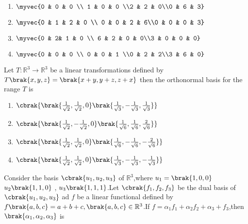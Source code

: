   \begin{multicols}{4}
      \begin{enumerate}
          \item $\myvec{0 & 0 & 0 \\ 1 & 0 & 0 \\2 & 2 & 0\\0 & 6 & 3}$
          \item $\myvec{0 & 1 & 2 & 0 \\ 0 & 0 & 2 & 6\\0 & 0 & 0 & 3}$
         \item $\myvec{0 & 2& 1 & 0 \\ 6 & 2 & 0 & 0\\3 & 0 & 0 & 0}$
          \item $\myvec{0 & 0 & 0 \\ 0 & 0 & 1 \\0 & 2 & 2\\3 & 6 & 0}$
      \end{enumerate}
  \end{multicols}
  \item Let $T \colon \mathbb{R}^3 \rightarrow \mathbb{R}^3$ be a linear transformations defined by  $T\brak{x,y,z} = \brak{x+y,y+z,z+x}$ then the orthonormal basis for the range $T$ is
  \begin{multicols}{2}
      \begin{enumerate}
          \item $\cbrak{\brak{\frac{1}{\sqrt 2},\frac{1}{\sqrt 2},0}\brak{\frac{1}{\sqrt 3},-\frac{1}{\sqrt 3},\frac{1}{\sqrt 3}}}$
          \item $\cbrak{\brak{\frac{1}{\sqrt 2},-\frac{1}{\sqrt 2},0}\brak{\frac{1}{\sqrt 6},\frac{1}{\sqrt 6},\frac{2}{\sqrt 6}}}$
              \item $\cbrak{\brak{\frac{1}{\sqrt 2},\frac{1}{\sqrt 2},0}\brak{\frac{1}{\sqrt 6},-\frac{1}{\sqrt 6},-\frac{2}{\sqrt 6}}}$
          \item $\cbrak{\brak{\frac{1}{\sqrt 2},\frac{1}{\sqrt 2},0}\brak{\frac{1}{\sqrt 3},-\frac{1}{\sqrt 3},-\frac{1}{\sqrt 3}}}$\\
      \end{enumerate}
  \end{multicols}
  \item Consider the basis $\cbrak{u_1,u_2,u_3}$ of $\mathbb{R}^3$,where $u_1 = \brak{1,0,0}$ $u_2\brak{1,1,0}$ , $u_3\brak{1,1,1}$.Let $\cbrak{f_1,f_2,f_3}$ be the dual basis of $\cbrak{u_1,u_2,u_3}$ ad $f$ be a linear functional defined by $f\brak{a,b,c} = a+b+c , \brak{a,b,c}\in\mathbb{R}^3$.If $f = \alpha_1f_1+\alpha_2f_2+\alpha_3+f_3$,then $\brak{\alpha_1,\alpha_2,\alpha_3}$ is
